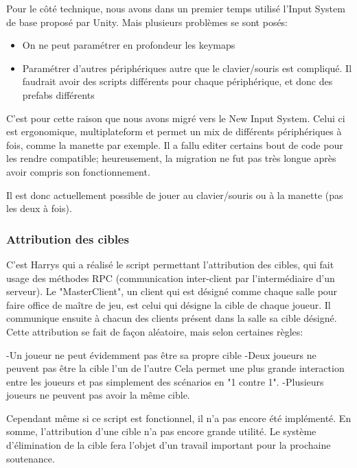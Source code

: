             Pour le côté technique, nous avons dans un premier temps utilisé l'Input System de base proposé par Unity. Mais plusieurs problèmes se sont posés:
            \begin{itemize}
                \item On ne peut paramétrer en profondeur les keymaps
                \item Paramétrer d'autres périphériques autre que le clavier/souris est compliqué. Il faudrait avoir des scripts différents pour chaque périphérique, et donc des prefabs différents
            \end{itemize}
            C'est pour cette raison que nous avons migré vers le New Input System.
            Celui ci est ergonomique, multiplateform et permet un mix de différents périphériques à fois, comme la manette par exemple.
            Il a fallu editer certains bout de code pour les rendre compatible; heureusement, la migration ne fut pas très longue après avoir compris son fonctionnement.

            Il est donc actuellement possible de jouer au clavier/souris ou à la manette (pas les deux à fois).
            
        \subsubsection{Attribution des cibles}
            
            C'est Harrys qui a réalisé le script permettant l'attribution des cibles, qui fait usage des méthodes RPC (communication inter-client par l'intermédiaire d'un serveur). Le "MasterClient", un client qui est désigné comme chaque salle pour faire office de maître de jeu, est celui qui désigne la cible de chaque joueur. Il communique ensuite à chacun des clients présent dans la salle sa cible désigné. Cette attribution se fait de façon aléatoire, mais selon certaines règles:
                
                -Un joueur ne peut évidemment pas être sa propre cible
                -Deux joueurs ne peuvent pas être la cible l'un de l'autre
                 Cela permet une plus grande interaction entre les joueurs et pas simplement des scénarios en "1 contre 1".
                -Plusieurs joueurs ne peuvent pas avoir la même cible.
                
            Cependant même si ce script est fonctionnel, il n'a pas encore été implémenté. En somme, l'attribution d'une cible n'a pas encore grande utilité. Le système d'élimination de la cible fera l'objet d'un travail important pour la prochaine soutenance.
        
